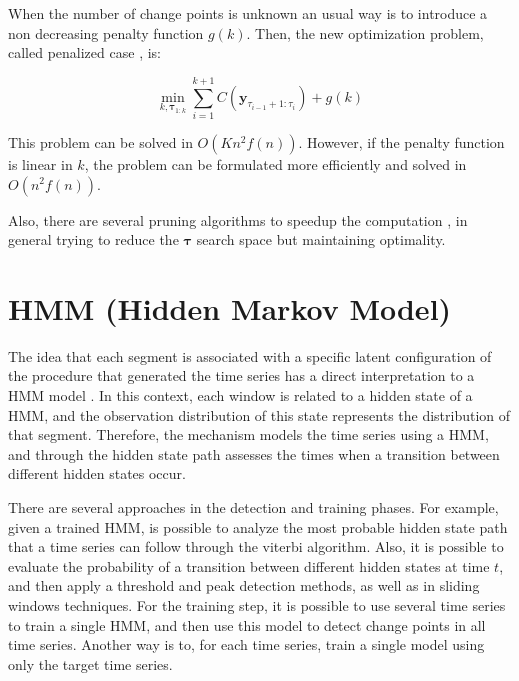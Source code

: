 When the number of change points is unknown an usual way is to introduce a non decreasing penalty function $g(k)$. Then, the new optimization problem, called penalized case \cite{on_optimal_multiple_changepoint_algorithms_for_large_data}, is:

\begin{equation}
    \min_{k, \boldsymbol \tau_{1 : k}} \sum \limits_{i = 1}^{k + 1} C(\mathbf{y}_{\tau_{i - 1} + 1 : \tau_{i}}) + g(k)
\end{equation}

This problem can be solved in $O(K n^{2} f(n))$. However, if the penalty function is linear in $k$, the problem can be formulated more efficiently and solved in $O(n^{2} f(n))$.

Also, there are several pruning algorithms to speedup the computation \cite{optimal_detection_of_changepoints_with_a_linear_computational_cost, on_optimal_multiple_changepoint_algorithms_for_large_data, computationally_efficient_changepoint_detection_for_a_range_of_penalties}, in general trying to reduce the $\boldsymbol \tau$ search space but maintaining optimality.

\section{HMM (Hidden Markov Model)}

The idea that each segment is associated with a specific latent configuration of the procedure that generated the time series has a direct interpretation to a HMM model \cite{a_hidden_markov_model_segmentation_procedure_for_hydrological_and_environmental_time_series, fast_estimation_of_posterior_probabilities_in_change-point_analysis_through_a_constrained_hidden_markov_model, inertial_hidden_markov_models_modeling_change_in_multivariate_time_series}. In this context, each window is related to a hidden state of a HMM, and the observation distribution of this state represents the distribution of that segment. Therefore, the mechanism models the time series using a HMM, and through the hidden state path assesses the times when a transition between different hidden states occur.

There are several approaches in the detection and training phases. For example, given a trained HMM, is possible to analyze the most probable hidden state path that a time series can follow through the viterbi algorithm. Also, it is possible to evaluate the probability of a transition between different hidden states at time $t$, and then apply a threshold and peak detection methods, as well as in sliding windows techniques. For the training step, it is possible to use several time series to train a single HMM, and then use this model to detect change points in all time series. Another way is to, for each time series, train a single model using only the target time series.

